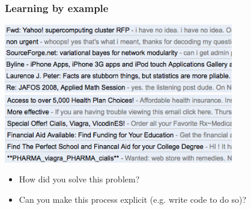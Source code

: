 \documentclass[xcolor=dvipsnames, 9pt]{beamer}
\begin{document}
\begin{frame}
  \frametitle{Learning by example}

    \begin{center}
      \includegraphics[width=0.75\textwidth]{email_ham.png}
      \includegraphics[width=0.75\textwidth]{email_spam.png}
    \end{center}

    \begin{itemize}
      \pause
      \item How did you solve this problem?
      \item \alert<2>{Can you make this process explicit (e.g. write code to do so)?}
    \end{itemize}

\end{frame}
\end{document}
